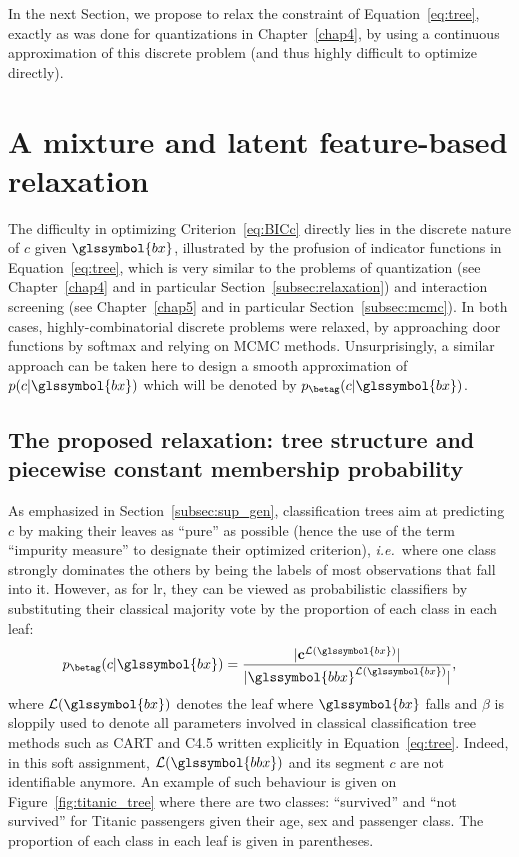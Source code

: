 In the next Section, we propose to relax the constraint of Equation~\eqref{eq:tree}, exactly as was done for quantizations in Chapter~\ref{chap4}, by using a continuous approximation of this discrete problem (and thus highly difficult to optimize directly).


\section{A mixture and latent feature-based relaxation}

The difficulty in optimizing Criterion~\eqref{eq:BICc} directly lies in the discrete nature of $c$ given $\glssymbol{bx}$, illustrated by the profusion of indicator functions in Equation~\eqref{eq:tree}, which is very similar to the problems of quantization (see Chapter~\ref{chap4} and in particular Section~\ref{subsec:relaxation}) and interaction screening (see Chapter~\ref{chap5} and in particular Section~\ref{subsec:mcmc}). In both cases, highly-combinatorial discrete problems were relaxed, by approaching door functions by softmax and relying on MCMC methods. Unsurprisingly, a similar approach can be taken here to design a smooth approximation of $p(c | \glssymbol{bx})$ which will be denoted by $p_{\betag}(c | \glssymbol{bx})$.

\subsection{The proposed relaxation: tree structure and piecewise constant membership probability} \label{subsec:relax_tree}

As emphasized in Section~\ref{subsec:sup_gen}, classification trees aim at predicting $c$ by making their leaves as ``pure'' as possible (hence the use of the term ``impurity measure'' to designate their optimized criterion), \textit{i.e.}\ where one class strongly dominates the others by being the labels of most observations that fall into it. However, as for \gls{lr}, they can be viewed as probabilistic classifiers by substituting their classical majority vote by the proportion of each class in each leaf:
\begin{equation}
p_{\betag}(c | \glssymbol{bx}) = \frac{|\mathbf{c}^{\mathcal{L}(\glssymbol{bx})}|}{|\glssymbol{bbx}^{\mathcal{L}(\glssymbol{bx})}|},
\end{equation}
where $\mathcal{L}(\glssymbol{bx})$ denotes the leaf where $\glssymbol{bx}$ falls and $\beta$ is sloppily used to denote all parameters involved in classical classification tree methods such as CART and C4.5 written explicitly in Equation~\eqref{eq:tree}. Indeed, in this soft assignment, $\mathcal{L}(\glssymbol{bbx})$ and its segment $c$ are not identifiable anymore. An example of such behaviour is given on Figure~\ref{fig:titanic_tree} where there are two classes: ``survived'' and ``not survived'' for Titanic passengers given their age, sex and passenger class. The proportion of each class in each leaf is given in parentheses.

